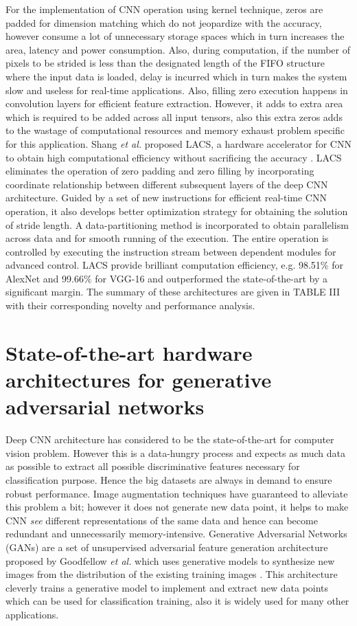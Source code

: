\documentclass[journal]{IEEEtran}
\begin{document}
\par For the implementation of CNN operation using kernel technique, zeros are padded for dimension matching which do not jeopardize with the accuracy, however consume a lot of unnecessary storage spaces which in turn increases the area, latency and power consumption. Also, during computation, if the number of pixels to be strided is less than the designated length of the FIFO structure where the input data is loaded, delay is incurred which in turn makes the system slow and useless for real-time applications. Also, filling zero execution happens in convolution layers for efficient feature extraction. However, it adds to extra area which is required to be added across all input tensors, also this extra zeros adds to the wastage of computational resources and memory exhaust problem specific for this application. Shang \textit{et al.} proposed LACS, a hardware accelerator for CNN to obtain high computational efficiency without sacrificing the accuracy \cite{paper32}. LACS eliminates the operation of zero padding and zero filling by incorporating coordinate relationship between different subsequent layers of the deep CNN architecture. Guided by a set of new instructions for efficient real-time CNN operation, it also develops better optimization strategy for obtaining the solution of stride length. A data-partitioning method is incorporated to obtain parallelism across data and for smooth running of the execution. The entire operation is controlled by executing the instruction stream between dependent modules for advanced control. LACS provide brilliant computation efficiency, e.g. 98.51\% for AlexNet and 99.66\% for VGG-16 and outperformed the state-of-the-art by a significant margin. The summary of these architectures are given in TABLE III with their corresponding novelty and performance analysis.

\section{State-of-the-art hardware architectures for generative adversarial networks}

Deep CNN architecture has considered to be the state-of-the-art for computer vision problem. However this is a data-hungry process and expects as much data as possible to extract all possible discriminative features necessary for classification purpose. Hence the big datasets are always in demand to ensure robust performance. Image augmentation techniques have guaranteed to alleviate this problem a bit; however it does not generate new data point, it helps to make CNN \textit{see} different representations of the same data and hence can become redundant and unnecessarily memory-intensive. Generative Adversarial Networks (GANs) are a set of unsupervised adversarial feature generation architecture proposed by Goodfellow \textit{et al.} which uses generative models to synthesize new images from the distribution of the existing training images \cite{paper33}. This architecture cleverly trains a generative model to implement and extract new data points which can be used for classification training, also it is widely used for many other applications.
\end{document}
